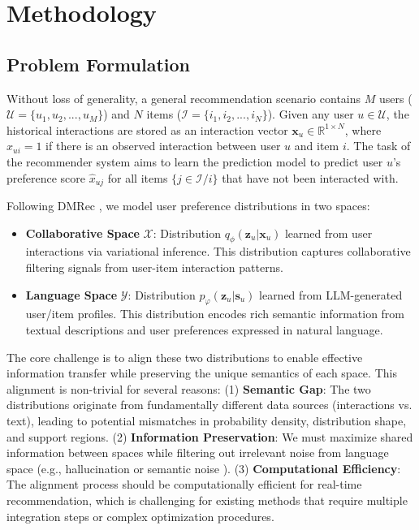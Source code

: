 \documentclass[sigconf]{acmart}
\begin{document}
\section{Methodology}
\subsection{Problem Formulation}
Without loss of generality, a general recommendation scenario contains $M$ users ($\mathcal U=\{u_1, u_2, ..., u_M\}$) and $N$ items ($\mathcal I=\{i_1, i_2, ..., i_N\}$). Given any user $u \in \mathcal U$, the historical interactions are stored as an interaction vector $\mathbf x_u \in \mathbb R^{1\times N}$, where $x_{ui}=1$ if there is an observed interaction between user $u$ and item $i$. The task of the recommender system aims to learn the prediction model to predict user $u$'s preference score $\hat{x}_{uj}$ for all items $\{j \in \mathcal I /i\}$ that have not been interacted with.

Following DMRec \cite{zhang2024dmrec}, we model user preference distributions in two spaces:
\begin{itemize}[leftmargin=*]
\item \textbf{Collaborative Space} $\mathcal X$: Distribution $q_\phi(\mathbf z_u|\mathbf x_u)$ learned from user interactions via variational inference. This distribution captures collaborative filtering signals from user-item interaction patterns.
\item \textbf{Language Space} $\mathcal Y$: Distribution $p_\varphi(\mathbf z_u|\mathbf s_u)$ learned from LLM-generated user/item profiles. This distribution encodes rich semantic information from textual descriptions and user preferences expressed in natural language.
\end{itemize}

The core challenge is to align these two distributions to enable effective information transfer while preserving the unique semantics of each space. This alignment is non-trivial for several reasons: (1) \textbf{Semantic Gap}: The two distributions originate from fundamentally different data sources (interactions vs. text), leading to potential mismatches in probability density, distribution shape, and support regions. (2) \textbf{Information Preservation}: We must maximize shared information between spaces while filtering out irrelevant noise from language space (e.g., hallucination \cite{ji2023survey} or semantic noise \cite{wei2024llmrec}). (3) \textbf{Computational Efficiency}: The alignment process should be computationally efficient for real-time recommendation, which is challenging for existing methods that require multiple integration steps or complex optimization procedures.
\end{document}
